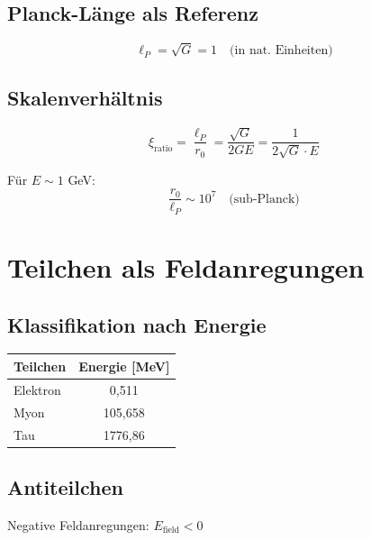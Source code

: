 	\subsection{Planck-Länge als Referenz}
	
	\begin{equation}
		\ell_P = \sqrt{G} = 1 \quad \text{(in nat. Einheiten)}
	\end{equation}
	
	\subsection{Skalenverhältnis}
	
	\begin{equation}
		\xi_{\text{ratio}} = \frac{\ell_P}{r_0} = \frac{\sqrt{G}}{2GE} = \frac{1}{2\sqrt{G} \cdot E}
	\end{equation}
	
	Für $E \sim 1$ GeV:
	\begin{equation}
		\frac{r_0}{\ell_P} \sim 10^7 \quad \text{(sub-Planck)}
	\end{equation}
	
	\section{Teilchen als Feldanregungen}
	\label{sec:particles}
	
	\subsection{Klassifikation nach Energie}
	
	\begin{table}[h]
		\centering
		\begin{tabular}{lc}
			\hline
			\textbf{Teilchen} & \textbf{Energie [MeV]} \\
			\hline
			Elektron & 0,511 \\
			Myon & 105,658 \\
			Tau & 1776,86 \\
			\hline
		\end{tabular}
	\end{table}
	
	\subsection{Antiteilchen}
	
	Negative Feldanregungen: $E_{\text{field}} < 0$
	
